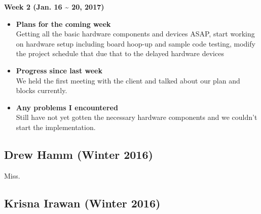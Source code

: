 		
	\begin{center}
		\textbf{Week 2 (Jan. 16 {\textasciitilde{}} 20, 2017)}
	\end{center}
	\begin{itemize}
		\item \textbf{Plans for the coming week}
		\\Getting all the basic hardware components and devices ASAP, start working on hardware setup including board hoop-up and sample code testing, modify the project schedule that due that to the delayed hardware devices\\

		\item \textbf{Progress since last week}
		\\We held the first meeting with the client and talked about our plan and blocks currently.\\

		\item \textbf{Any problems I encountered}
		\\Still have not yet gotten the necessary hardware components and we couldn't start the implementation.\\
	\end{itemize}


\newpage
	\subsection{Drew Hamm (Winter 2016)}
	\vspace{0.5cm}
	Miss.

	\subsection{Krisna Irawan (Winter 2016)}
	\vspace{0.5cm}

